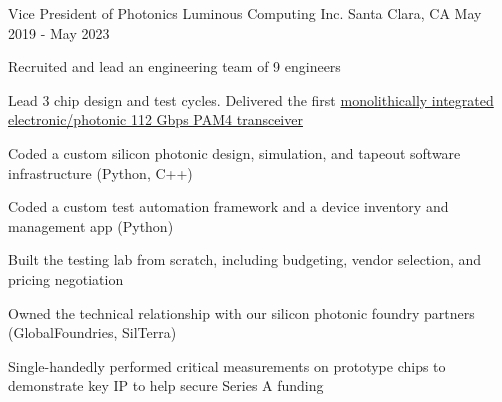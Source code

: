 

\begin{cventries}


  \cventry
    {Vice President of Photonics} %
    {Luminous Computing Inc.}
    {Santa Clara, CA} %
    {May 2019 - May 2023} %
    {
      \begin{cvitems} %
        \item {Recruited and lead an engineering team of 9 engineers}
        \item {Lead 3 chip design and test cycles. Delivered the first \href{https://preprints.opticaopen.org/articles/preprint/Monolithically_integrated_112_Gbps_PAM4_optical_transmitter_and_receiver_in_a_45nm_CMOS-silicon_photonics_process/22814837}{monolithically integrated electronic/photonic 112 Gbps PAM4 transceiver}}
        \item {Coded a custom silicon photonic design, simulation, and tapeout software infrastructure (Python, C++)}
        \item {Coded a custom test automation framework and a device inventory and management app (Python)}
        \item {Built the testing lab from scratch, including budgeting, vendor selection, and pricing negotiation}
        \item {Owned the technical relationship with our silicon photonic foundry partners (GlobalFoundries, SilTerra)}
        \item {Single-handedly performed critical measurements on prototype chips to demonstrate key IP to help secure Series A funding}
      \end{cvitems}
    }
    

\end{cventries}
